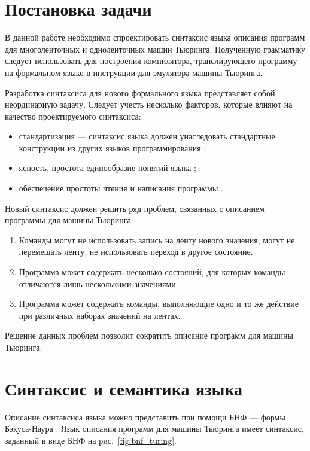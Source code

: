 \documentclass[10pt, normalheadings]{scrartcl}
\begin{document}
\begin{multicols}{2}
\section*{Постановка задачи}

В данной работе необходимо спроектировать синтаксис языка описания программ для многоленточных и одноленточных машин Тьюринга. Полученную грамматику следует использовать для построения компилятора, транслирующего программу на формальном языке в инструкции для эмулятора машины Тьюринга.

Разработка синтаксиса для нового формального языка представляет собой неординарную задачу. Следует учесть несколько факторов, которые влияют на качество проектируемого синтаксиса:
\begin{itemize}
	\item стандартизация --- синтаксис языка должен унаследовать стандартные конструкции из других языков программирования \cite[с.~48]{Pratt_Languages};
	\item ясность, простота единообразие понятий языка \cite[с.~38]{Pratt_Languages};
	\item обеспечение простоты чтения и написания программы \cite[c.~94]{Pratt_Languages}.
\end{itemize}

Новый синтаксис должен решить ряд проблем, связанных с описанием программы для машины Тьюринга:
\begin{enumerate}
	\item Команды могут не использовать запись на ленту нового значения, могут не перемещать ленту, не использовать переход в другое состояние.\label{item:task1}
	\item Программа может содержать несколько состояний, для которых команды отличаются лишь несколькими значениями.\label{item:task2}
	\item Программа может содержать команды, выполняющие одно и то же действие при различных наборах значений на лентах.\label{item:task3}
\end{enumerate}

Решение данных проблем позволит сократить описание программ для машины Тьюринга. 

\section*{Синтаксис и семантика языка}

Описание синтаксиса языка можно представить при помощи БНФ --- формы Бэкуса-Наура \cite[с.~17]{Serebryacov_Compillers}. Язык описания программ для машины Тьюринга имеет синтаксис, заданный в виде БНФ на рис.~\ref{fig:bnf_turing}.


\end{multicols}
\end{document}
